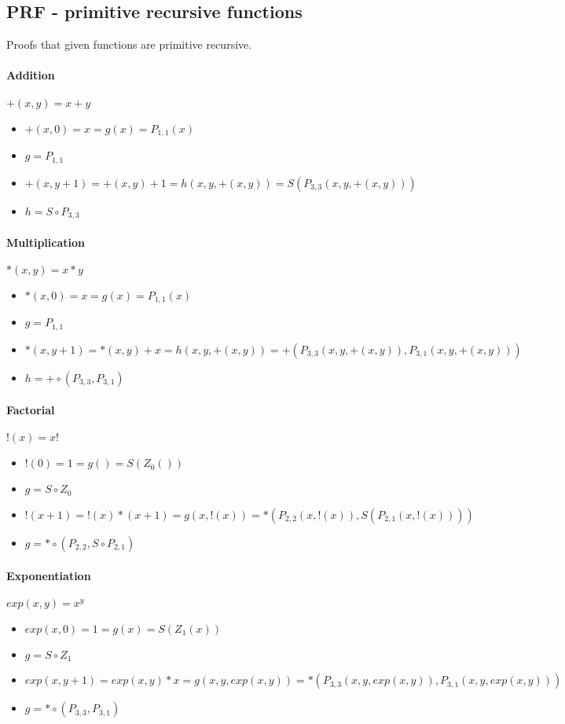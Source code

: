 \documentclass{article}
\begin{document}
\subsection{PRF - primitive recursive functions}
Proofs that given functions are primitive recursive.

\paragraph{Addition} $+(x,y) = x+y$
\begin{itemize}[noitemsep,nolistsep]
  \item $+(x,0) = x = g(x) = P_{1,1}(x)$
  \item $g = P_{1,1}$
  \item $+(x,y+1) = +(x,y)+1 = h(x,y,+(x,y)) = S(P_{3,3}(x,y,+(x,y)))$
  \item $h = S \circ P_{3,3}$
\end{itemize}

\paragraph{Multiplication} $*(x,y) = x*y$
\begin{itemize}[noitemsep,nolistsep]
  \item $*(x,0) = x = g(x) = P_{1,1}(x)$
  \item $g = P_{1,1}$
  \item $*(x,y+1) = *(x,y)+x = h(x,y,+(x,y)) = +(P_{3,3}(x,y,+(x,y)),P_{3,1}(x,y,+(x,y)))$
  \item $h = + \circ (P_{3,3},P_{3,1})$
\end{itemize}

\paragraph{Factorial} $!(x) = x!$
\begin{itemize}[noitemsep,nolistsep]
  \item $!(0) = 1 = g() = S(Z_0())$
  \item $g = S \circ Z_0$
  \item $!(x+1) = !(x)*(x+1) = g(x,!(x)) = *(P_{2,2}(x,!(x)),S(P_{2,1}(x,!(x))))$
  \item $g = * \circ (P_{2,2}, S \circ P_{2,1})$
\end{itemize}

\paragraph{Exponentiation} $exp(x,y) = x^y$
\begin{itemize}[noitemsep,nolistsep]
  \item $exp(x,0) = 1 = g(x) = S(Z_1(x))$
  \item $g = S \circ Z_1$
  \item $exp(x,y+1) = exp(x,y)*x = g(x,y,exp(x,y)) = *(P_{3,3}(x,y,exp(x,y)),P_{3,1}(x,y,exp(x,y)))$
  \item $g = * \circ (P_{3,3}, P_{3,1})$
\end{itemize}
\end{document}
